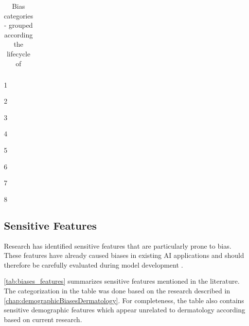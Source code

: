 \documentclass[12pt, a4paper, oneside]{book}   	%
\newcommand{\tblWidthDescription}{\hsize=0.6\hsize\raggedright}
\newcommand{\tblWidthContext}{\hsize=0.18\hsize}
\begin{document}
\begin{table}[H]
\begin{threeparttable}
\begin{tabularx}{\textwidth}{>{\tblWidthDescription}X|>{\tblWidthContext}X|>{\tblWidthContext}X}
						\bottomrule
					\end{tabularx}
					\begin{tablenotes}
						\footnotesize
						\begin{minipage}{0.33\textwidth}\raggedright
							\item[1] \autocite{Mehrabi_2021}
							\item[2] \autocite{HP_2022}
							\item[3] \autocites{Mester_2022}
						\end{minipage}%
						\begin{minipage}{0.33\textwidth}\raggedright
							\item[4] \autocite{Chakraborty_2024}
							\item[5] \autocite{Young_2020}
							\item[6] \autocite{Montoya_2025}
						\end{minipage}%
						\begin{minipage}{0.33\textwidth}\raggedright
							\item[7] \autocites{Mester_2017}
							\item[8] \autocite{Delgado-Rodriguez_2004}
						\end{minipage}%
					\end{tablenotes}
				\end{threeparttable}
				\caption{Bias categories - grouped according the  lifecycle of \textcite{Mehrabi_2021}}
				\label{tab:biases_types}
			\end{table}
			
			
			\subsection{Sensitive Features}
			Research has identified sensitive features that are particularly prone to bias. These features have already caused biases in existing \gls{AI} applications and should therefore be carefully evaluated during model development \autocite{Mehrabi_2021}.
			
			\autoref{tab:biases_features} summarizes sensitive features mentioned in the literature. The categorization in the table was done based on the research described in \autoref{chap:demographicBiasesDermatology}. For completeness, the table also contains sensitive demographic features which appear unrelated to dermatology according based on current research.
			
\end{document}
